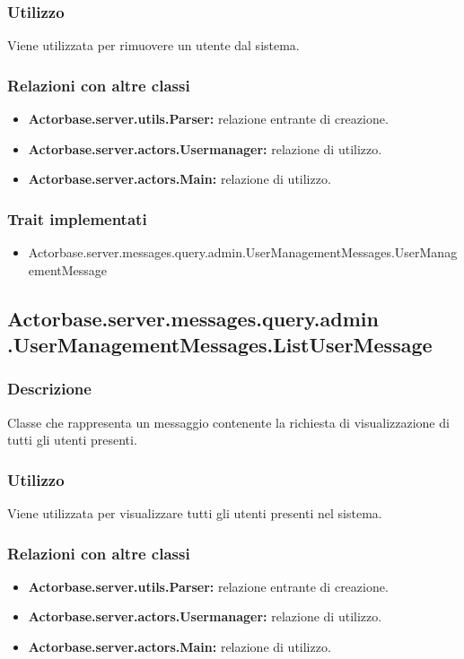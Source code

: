 \documentclass[a4paper]{article}
\begin{document}
			\subsubsection{Utilizzo}
				Viene utilizzata per rimuovere un utente dal sistema.
				
			\subsubsection{Relazioni con altre classi}
				\begin{itemize}
					\item \textbf{Actorbase.server.utils.Parser:} relazione entrante di creazione.
					\item \textbf{Actorbase.server.actors.Usermanager:} relazione di utilizzo.
					\item \textbf{Actorbase.server.actors.Main:} relazione di utilizzo.
				\end{itemize}
			\subsubsection{Trait implementati}
				\begin{itemize}
					\item Actorbase.server.messages.query.admin.UserManagementMessages.UserManagementMessage
				\end{itemize}
				
		\subsection{Actorbase.server.messages.query.admin \newline 
		.UserManagementMessages.ListUserMessage}
			\subsubsection{Descrizione}
				Classe che rappresenta un messaggio contenente la richiesta di visualizzazione di tutti gli utenti presenti.
				
			\subsubsection{Utilizzo}
				Viene utilizzata per visualizzare tutti gli utenti presenti nel sistema.
				
			\subsubsection{Relazioni con altre classi}
				\begin{itemize}
					\item \textbf{Actorbase.server.utils.Parser:} relazione entrante di creazione.
					\item \textbf{Actorbase.server.actors.Usermanager:} relazione di utilizzo.
					\item \textbf{Actorbase.server.actors.Main:} relazione di utilizzo.
				\end{itemize}
\end{document}
